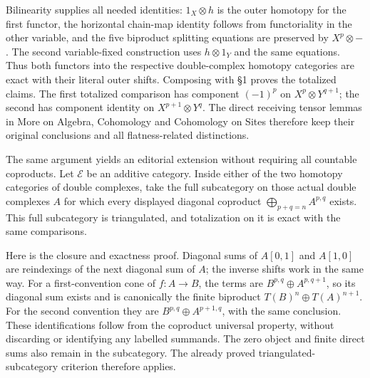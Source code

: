 Bilinearity supplies all needed identities:\allowbreak{} \(1_X\otimes h\) is the outer homotopy for the first functor,\allowbreak{} the horizontal chain-map identity follows from functoriality in the other variable,\allowbreak{} and the five biproduct splitting equations are preserved by \(X^p\otimes-\). The second variable-fixed construction uses \(h\otimes1_Y\) and the same equations. Thus both functors into the respective double-complex homotopy categories are exact with their literal outer shifts. Composing with §1 proves the totalized claims. The first totalized comparison has component \((-1)^p\) on \(X^p\otimes Y^{q+1}\); the second has component identity on \(X^{p+1}\otimes Y^q\). The direct receiving tensor lemmas in More on Algebra,\allowbreak{} Cohomology and Cohomology on Sites therefore keep their original conclusions and all flatness-related distinctions.

The same argument yields an editorial extension without requiring all countable coproducts. Let \(\mathcal E\) be an additive category. Inside either of the two homotopy categories of double complexes,\allowbreak{} take the full subcategory on those actual double complexes \(A\) for which every displayed diagonal coproduct \(\bigoplus_{p+q=n}A^{p,q}\) exists. This full subcategory is triangulated,\allowbreak{} and totalization on it is exact with the same comparisons.

Here is the closure and exactness proof. Diagonal sums of \(A[0,1]\) and \(A[1,0]\) are reindexings of the next diagonal sum of \(A\); the inverse shifts work in the same way. For a first-convention cone of \(f:A\to B\),\allowbreak{} the terms are \(B^{p,q}\oplus A^{p,q+1}\),\allowbreak{} so its diagonal sum exists and is canonically the finite biproduct \(T(B)^n\oplus T(A)^{n+1}\). For the second convention they are \(B^{p,q}\oplus A^{p+1,q}\),\allowbreak{} with the same conclusion. These identifications follow from the coproduct universal property,\allowbreak{} without discarding or identifying any labelled summands. The zero object and finite direct sums also remain in the subcategory. The already proved triangulated-subcategory criterion therefore applies.

